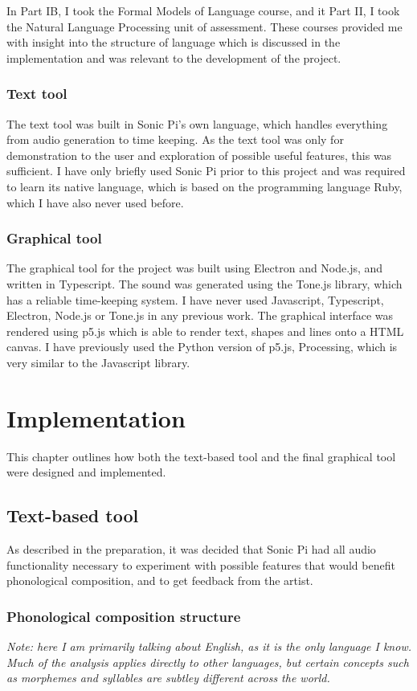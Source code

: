 \documentclass[12pt,a4paper,twoside,openright]{report}
\begin{document}
In Part IB, I took the Formal Models of Language course, and it Part II, I took the Natural Language Processing unit of assessment. These courses provided me with insight into the structure of language which is discussed in the implementation and was relevant to the development of the project.

\subsection{Text tool}
The text tool was built in Sonic Pi's own language, which handles everything from audio generation to time keeping. As the text tool was only for demonstration to the user and exploration of possible useful features, this was sufficient. I have only briefly used Sonic Pi prior to this project and was required to learn its native language, which is based on the programming language Ruby, which I have also never used before.

\subsection{Graphical tool}
The graphical tool for the project was built using Electron and Node.js, and written in Typescript. The sound was generated using the Tone.js library, which has a reliable time-keeping system. I have never used Javascript, Typescript, Electron, Node.js or Tone.js in any previous work. The graphical interface was rendered using p5.js which is able to render text, shapes and lines onto a HTML canvas. I have previously used the Python version of p5.js, Processing, which is very similar to the Javascript library.

\chapter{Implementation}
This chapter outlines how both the text-based tool and the final graphical tool were designed and implemented.

\section{Text-based tool}
As described in the preparation, it was decided that Sonic Pi had all audio functionality necessary to experiment with possible features that would benefit phonological composition, and to get feedback from the artist.
\subsection{Phonological composition structure}
\textit{Note: here I am primarily talking about English, as it is the only language I know. Much of the analysis applies directly to other languages, but certain concepts such as morphemes and syllables are subtley different across the world.}
\end{document}
